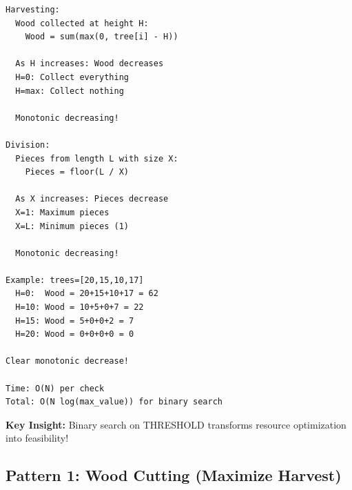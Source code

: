\documentclass[11pt,a4paper,oneside]{book}
\begin{document}
\begin{tcolorbox}[
    enhanced,breakable,
    colback=white,
    colframe=deepblue,
    boxrule=1.5pt,
    arc=3mm,
    title=\textbf{The Harvesting and Division Paradigm}
]
\begin{verbatim}
Harvesting:
  Wood collected at height H:
    Wood = sum(max(0, tree[i] - H))
  
  As H increases: Wood decreases
  H=0: Collect everything
  H=max: Collect nothing
  
  Monotonic decreasing!

Division:
  Pieces from length L with size X:
    Pieces = floor(L / X)
  
  As X increases: Pieces decrease
  X=1: Maximum pieces
  X=L: Minimum pieces (1)
  
  Monotonic decreasing!

Example: trees=[20,15,10,17]
  H=0:  Wood = 20+15+10+17 = 62
  H=10: Wood = 10+5+0+7 = 22
  H=15: Wood = 5+0+0+2 = 7
  H=20: Wood = 0+0+0+0 = 0

Clear monotonic decrease!

Time: O(N) per check
Total: O(N log(max_value)) for binary search
\end{verbatim}

\textbf{Key Insight:}
Binary search on THRESHOLD transforms resource optimization into feasibility!
\end{tcolorbox}

\subsection{Pattern 1: Wood Cutting (Maximize Harvest)}
\end{document}
